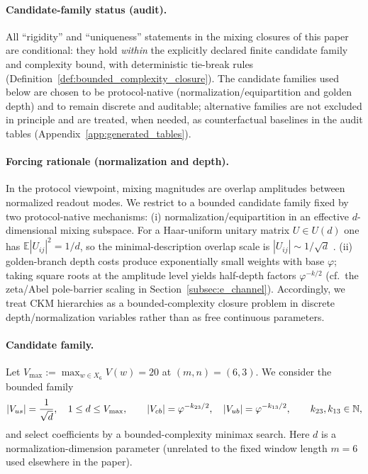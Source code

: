 \paragraph{Candidate-family status (audit).}
\AuditTag All ``rigidity'' and ``uniqueness'' statements in the mixing closures of this paper are conditional: they hold \emph{within} the explicitly declared finite candidate family and complexity bound, with deterministic tie-break rules (Definition~\ref{def:bounded_complexity_closure}).
The candidate families used below are chosen to be protocol-native (normalization/equipartition and golden depth) and to remain discrete and auditable; alternative families are not excluded in principle and are treated, when needed, as counterfactual baselines in the audit tables (Appendix~\ref{app:generated_tables}).

\paragraph{Forcing rationale (normalization and depth).}
In the protocol viewpoint, mixing magnitudes are overlap amplitudes between normalized readout modes.
We restrict to a bounded candidate family fixed by two protocol-native mechanisms:
(i) normalization/equipartition in an effective $d$-dimensional mixing subspace.
For a Haar-uniform unitary matrix $U\in U(d)$ one has $\mathbb{E}|U_{ij}|^2=1/d$, so the minimal-description overlap scale is $|U_{ij}|\sim 1/\sqrt{d}$ \cite{Mezzadri2007,CollinsSnady2006}.
(ii) golden-branch depth costs produce exponentially small weights with base $\varphi$; taking square roots at the amplitude level yields half-depth factors $\varphi^{-k/2}$ (cf.\ the zeta/Abel pole-barrier scaling in Section~\ref{subsec:e_channel}).
Accordingly, we treat CKM hierarchies as a bounded-complexity closure problem in discrete depth/normalization variables rather than as free continuous parameters.

\paragraph{Candidate family.}
Let $V_{\max}:=\max_{w\in X_6}V(w)=20$ at $(m,n)=(6,3)$.
We consider the bounded family
\begin{equation}\label{eq:ckm_candidate_family}
|V_{us}|=\frac{1}{\sqrt{d}},\quad 1\le d\le V_{\max},
\qquad
|V_{cb}|=\varphi^{-k_{23}/2},\quad |V_{ub}|=\varphi^{-k_{13}/2},
\qquad k_{23},k_{13}\in\mathbb{N},
\end{equation}
and select coefficients by a bounded-complexity minimax search.
Here $d$ is a normalization-dimension parameter (unrelated to the fixed window length $m=6$ used elsewhere in the paper).

